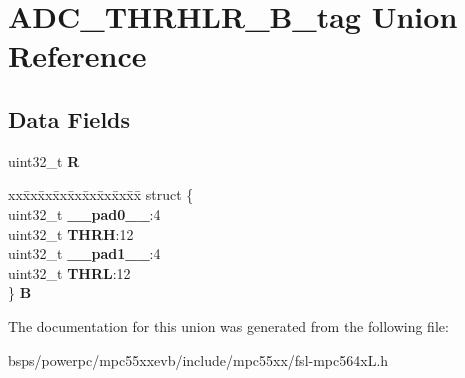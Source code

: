 \hypertarget{unionADC__THRHLR__32B__tag}{}\section{A\+D\+C\+\_\+\+T\+H\+R\+H\+L\+R\+\_\+B\+\_\+tag Union Reference}
\label{unionADC__THRHLR__32B__tag}
\subsection*{Data Fields}
\begin{DoxyCompactItemize}
\item 
\mbox{\label{unionADC__THRHLR__32B__tag_a74bec8c220952ca3681152141702027e}} 
uint32\+\_\+t {\bfseries R}
\item 
\mbox{\label{unionADC__THRHLR__32B__tag_a9bf4a6128bd20419c9501213ba6c39ea}} 
\begin{tabbing}
xx\=xx\=xx\=xx\=xx\=xx\=xx\=xx\=xx\=\kill
struct \{\\
\>uint32\_t {\bfseries \_\_pad0\_\_}:4\\
\>uint32\_t {\bfseries THRH}:12\\
\>uint32\_t {\bfseries \_\_pad1\_\_}:4\\
\>uint32\_t {\bfseries THRL}:12\\
\} {\bfseries B}\\

\end{tabbing}\end{DoxyCompactItemize}


The documentation for this union was generated from the following file\+:\begin{DoxyCompactItemize}
\item 
bsps/powerpc/mpc55xxevb/include/mpc55xx/fsl-\/mpc564x\+L.\+h\end{DoxyCompactItemize}
